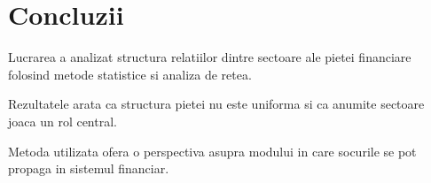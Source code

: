 \chapter{Concluzii}

Lucrarea a analizat structura relatiilor dintre sectoare ale pietei financiare folosind metode statistice si analiza de retea.

Rezultatele arata ca structura pietei nu este uniforma si ca anumite sectoare joaca un rol central.

Metoda utilizata ofera o perspectiva asupra modului in care socurile se pot propaga in sistemul financiar.